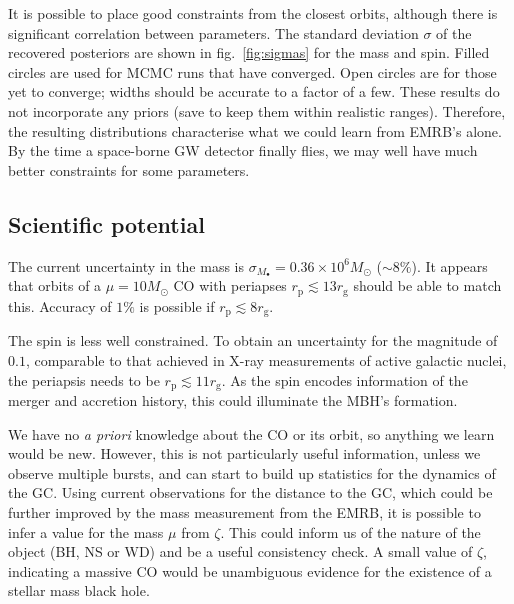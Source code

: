 \documentclass[11pt,twoside]{article}
\begin{document}
It is possible to place good constraints from the closest orbits, although there is significant correlation between parameters. The standard deviation $\sigma$ of the recovered posteriors are shown in fig.~\ref{fig:sigmas} for the mass and spin. Filled circles are used for MCMC runs that have converged. Open circles are for those yet to converge; widths should be accurate to a factor of a few.
These results do not incorporate any priors (save to keep them within realistic ranges). Therefore, the resulting distributions characterise what we could learn from EMRB's alone. By the time a space-borne GW detector finally flies, we may well have much better constraints for some parameters.

\subsection{Scientific potential}

The current uncertainty in the mass is $\sigma_{M_\bullet} = 0.36 \times 10^6 M_\odot$ ($\sim 8\%$). It appears that orbits of a $\mu = 10 M_\odot$ CO with periapses $r_\mathrm{p} \lesssim 13 r_\mathrm{g}$ should be able to match this. Accuracy of $1\%$ is possible if $r_\mathrm{p} \lesssim 8 r_\mathrm{g}$.

The spin is less well constrained. To obtain an uncertainty for the magnitude of $0.1$, comparable to that achieved in X-ray measurements of active galactic nuclei, the periapsis needs to be $r_\mathrm{p} \lesssim 11 r_\mathrm{g}$. As the spin encodes information of the merger and accretion history, this could illuminate the MBH's formation.

We have no {\it a priori} knowledge about the CO or its orbit, so anything we learn would be new. However, this is not particularly useful information, unless we observe multiple bursts, and can start to build up statistics for the dynamics of the GC. Using current observations for the distance to the GC, which could be further improved by the mass measurement from the EMRB, it is possible to infer a value for the mass $\mu$ from $\zeta$. This could inform us of the nature of the object (BH, NS or WD) and be a useful consistency check. A small value of $\zeta$, indicating a massive CO would be unambiguous evidence for the existence of a stellar mass black hole.



\end{document}

